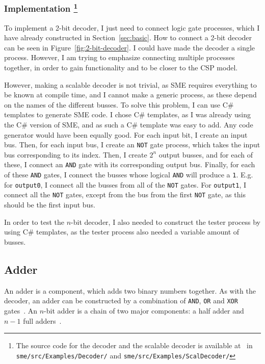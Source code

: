 \subsubsection*{Implementation
\footnote{The source code for the decoder and the scalable decoder is available
at~\cite{ref:github} in \texttt{sme/src/Examples/Decoder/} and
\texttt{sme/src/Examples/ScalDecoder/}}
}
To implement a 2-bit decoder, I just need to connect logic gate processes,
which I have already constructed in Section~\ref{sec:basic}. How to connect a
2-bit decoder can be seen in Figure~\ref{fig:2-bit-decoder}. I could have made
the decoder a single process. However, I am trying to emphasize connecting
multiple processes together, in order to gain functionality and to be closer to
the CSP model.

However, making a scalable decoder is not trivial, as SME requires everything
to be known at compile time, and I cannot make a generic process, as these
depend on the names of the different busses. To solve this problem, I can use
C\# templates to generate SME code. I chose C\# templates, as I was already
using the C\# version of SME, and as such a C\# template was easy to add. Any
code generator would have been equally good. For each input bit, I create an
input bus. Then, for each input bus, I create an \texttt{NOT} gate process,
which takes the input bus corresponding to its index. Then, I create $2^n$
output busses, and for each of these, I connect an \texttt{AND} gate with its
corresponding output bus. Finally, for each of these \texttt{AND} gates, I
connect the busses whose logical \texttt{AND} will produce a \texttt{1}. E.g.
for \texttt{output0}, I connect all the busses from all of the \texttt{NOT}
gates. For \texttt{output1}, I connect all the \texttt{NOT} gates, except from
the bus from the first \texttt{NOT} gate, as this should be the first input bus.

In order to test the $n$-bit decoder, I also needed to construct the tester
process by using C\# templates, as the tester process also needed a variable
amount of busses.

\subsection{Adder}
An adder is a component, which adds two binary numbers together. As with the
decoder, an adder can be constructed by a combination of \texttt{AND},
\texttt{OR} and \texttt{XOR} gates~\cite{ref:logic}. An $n$-bit adder is a
chain of two major components: a half adder and $n-1$ full
adders~\cite{ref:ark-book}.

